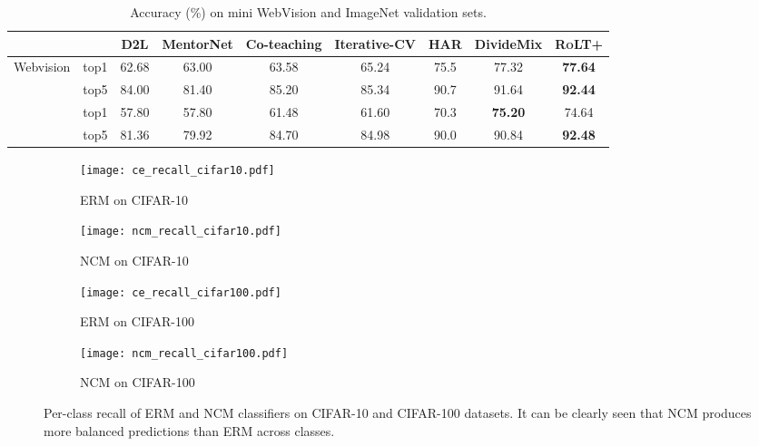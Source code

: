 \documentclass{article}
\def\algo{{\textsc{RoLT}}}
\begin{document}
\begin{table}[htbp]
\centering
\begin{center}
\begin{tabular}{l|c|c|c|c|c|c|c|c}
\toprule
& & D2L & MentorNet & Co-teaching & Iterative-CV & HAR & DivideMix & \textbf{\algo+} \\
\midrule
\multirow{2}{*}{Webvision} & top1 & 62.68 & 63.00 & 63.58 & 65.24 & 75.5 & 77.32 & \textbf{77.64} \\
                           & top5 & 84.00 & 81.40 & 85.20 & 85.34 & 90.7 & 91.64 & \textbf{92.44}\\
\hline
\rule{0pt}{2.2ex} \multirow{2}{*}{ImageNet} & top1 & 57.80 & 57.80 & 61.48 & 61.60 & 70.3 & \textbf{75.20} & 74.64\\
                           & top5 & 81.36 & 79.92 & 84.70 & 84.98 & 90.0 & 90.84 & \textbf{92.48}\\
\bottomrule
\end{tabular}
\end{center}
\caption{Accuracy (\%) on mini WebVision and ImageNet validation sets.}\label{exp:webvision}
\end{table}



\vspace{-0.55cm}
\begin{figure*}[h]
    \centering
    \begin{subfigure}[b]{0.24\textwidth}
        \centering
        \texttt{[image: ce\_recall\_cifar10.pdf]}
        \caption{ERM on CIFAR-10}
        \label{fig:ce_recall_cifar10}
    \end{subfigure}
    \begin{subfigure}[b]{0.24\textwidth}
        \centering
        \texttt{[image: ncm\_recall\_cifar10.pdf]} 
        \caption{NCM on CIFAR-10}\label{fig:ncm_recall_cifar10}
    \end{subfigure}
    \begin{subfigure}[b]{0.24\textwidth}
        \centering
        \texttt{[image: ce\_recall\_cifar100.pdf]} 
        \caption{ERM on CIFAR-100}\label{fig:ce_recall_cifar100}
    \end{subfigure}
    \begin{subfigure}[b]{0.24\textwidth}
        \centering
        \texttt{[image: ncm\_recall\_cifar100.pdf]} 
        \caption{NCM on CIFAR-100}\label{fig:ncm_recall_cifar100}
    \end{subfigure}
    \caption{Per-class recall of ERM and NCM classifiers on CIFAR-10 and CIFAR-100 datasets. It can be clearly seen that NCM produces more balanced predictions than ERM across classes.}
    \label{fig:recall-ce-ncm}
\end{figure*}
\end{document}
